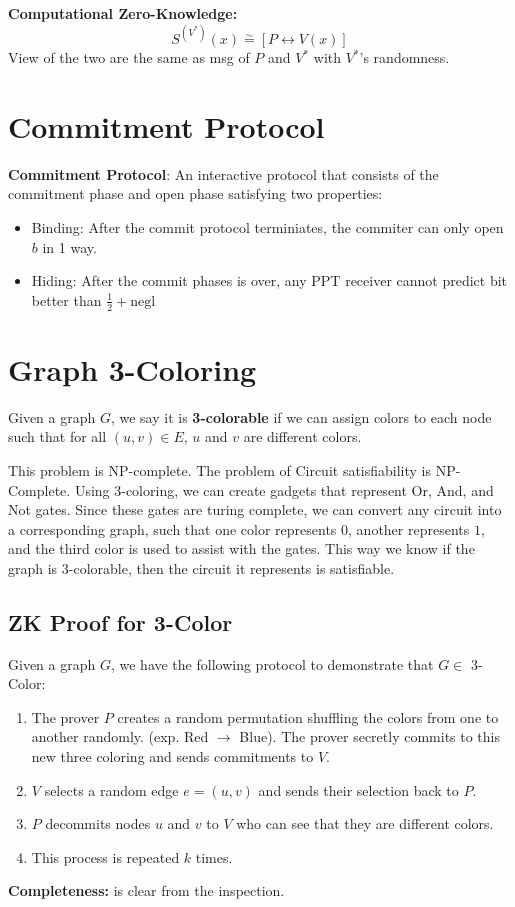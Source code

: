 \documentclass[11pt]{article}
\begin{document}
\textbf{Computational Zero-Knowledge:}
$$S^{(V^*)}(x) \overset{\sim}{=} [P \leftrightarrow V(x)]$$
View of the two are the same as msg of $P$ and $V^*$ with $V^*$'s randomness.

\section{Commitment Protocol}
\textbf{Commitment Protocol}: An interactive protocol that consists of the commitment phase and open phase satisfying two properties:
\begin{itemize}
    \item Binding: After the commit protocol terminiates, the commiter can only open $b$ in 1 way.
    \item Hiding: After the commit phases is over, any PPT receiver cannot predict bit better than $\frac{1}{2} + \text{negl}$
\end{itemize}

\section{Graph 3-Coloring}
Given a graph $G$, we say it is \textbf{3-colorable} if we can assign colors to each node such that for all $(u,v) \in E$, $u$ and $v$ are different colors.
\vspace{1em}

This problem is NP-complete. The problem of Circuit satisfiability is NP-Complete. Using 3-coloring, we can create gadgets that represent Or, And, and Not gates. Since these gates are turing complete, we can convert any circuit into a corresponding graph, such that one color represents $0$, another represents $1$, and the third color is used to assist with the gates. This way we know if the graph is 3-colorable, then the circuit it represents is satisfiable.

\subsection{ZK Proof for 3-Color}
Given a graph $G$, we have the following protocol to demonstrate that $G \in $ 3-Color:
\begin{enumerate}
    \item The prover $P$ creates a random permutation shuffling the colors from one to another randomly. (exp. Red $\rightarrow$ Blue). The prover secretly commits to this new three coloring and sends commitments to $V$.
    \item $V$ selects a random edge $e = (u,v)$ and sends their selection back to $P$.
    \item $P$ decommits nodes $u$ and $v$ to $V$ who can see that they are different colors.
    \item This process is repeated $k$ times.
\end{enumerate}
\textbf{Completeness:} is clear from the inspection.
\end{document}
